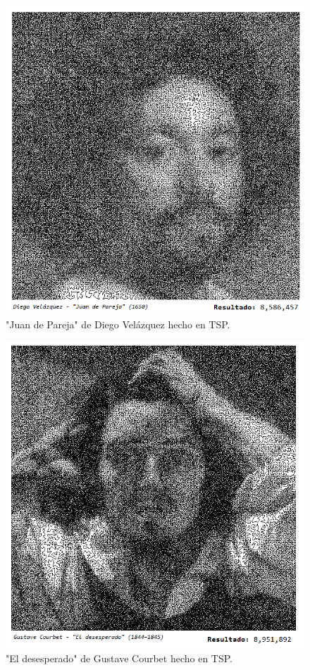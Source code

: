     \begin{figure}[hbtp]
        \centering
            \includegraphics[width=1\textwidth]{PruebasResultados/Imagenes/TSP_ART/pareja.png}
            \caption{"Juan de Pareja" de Diego Velázquez hecho en TSP.}
            \label{fig:pareja.png}
    \end{figure}
      \clearpage \newpage   
      
     \begin{figure}[hbtp]
        \centering
            \includegraphics[width=1\textwidth]{PruebasResultados/Imagenes/TSP_ART/courbet.png}
            \caption{"El desesperado" de Gustave Courbet hecho en TSP.}
            \label{fig:courbet.png}
    \end{figure}
      \clearpage \newpage
      
